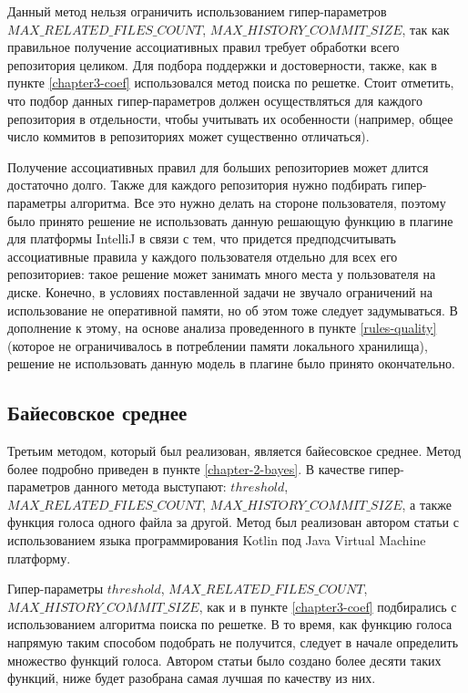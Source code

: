 Данный метод нельзя ограничить использованием гипер-параметров $MAX\_RELATED\_FILES\_COUNT$, $MAX\_HISTORY\_COMMIT\_SIZE$, так как правильное получение ассоциативных правил требует обработки всего репозитория целиком. Для подбора поддержки и достоверности, также, как в пункте \ref{chapter3-coef} использовался метод поиска по решетке. Стоит отметить, что подбор данных гипер-параметров должен осуществляться для каждого репозитория в отдельности, чтобы учитывать их особенности (например, общее число коммитов в репозиториях может существенно отличаться).

Получение ассоциативных правил для больших репозиториев может длится достаточно долго. Также для каждого репозитория нужно подбирать гипер-параметры алгоритма. Все это нужно делать на стороне пользователя, поэтому было принято решение не использовать данную решающую функцию в плагине для платформы IntelliJ в связи с тем, что придется предподсчитывать ассоциативные правила у каждого пользователя отдельно для всех его репозиториев: такое решение может занимать много места у пользователя на диске. Конечно, в условиях поставленной задачи не звучало ограничений на использование не оперативной памяти, но об этом тоже следует задумываться. В дополнение к этому, на основе анализа проведенного в пункте \ref{rules-quality} (которое не ограничивалось в потреблении памяти локального хранилища), решение не использовать данную модель в плагине было принято окончательно.

    \subsection{Байесовское среднее}\label{chapter3-bayes}
Третьим методом, который был реализован, является байесовское среднее. Метод более подробно приведен в пункте \ref{chapter-2-bayes}. В качестве гипер-параметров данного метода выступают: $threshold$, $MAX\_RELATED\_FILES\_COUNT$, $MAX\_HISTORY\_COMMIT\_SIZE$, а также функция голоса одного файла за другой. Метод был реализован автором статьи с использованием языка программирования Kotlin под Java Virtual Machine платформу.

Гипер-параметры $threshold$, $MAX\_RELATED\_FILES\_COUNT$, $MAX\_HISTORY\_COMMIT\_SIZE$, как и в пункте \ref{chapter3-coef} подбирались с использованием алгоритма поиска по решетке. В то время, как функцию голоса напрямую таким способом подобрать не получится, следует в начале определить множество функций голоса. Автором статьи было создано более десяти таких функций, ниже будет разобрана самая лучшая по качеству из них.

